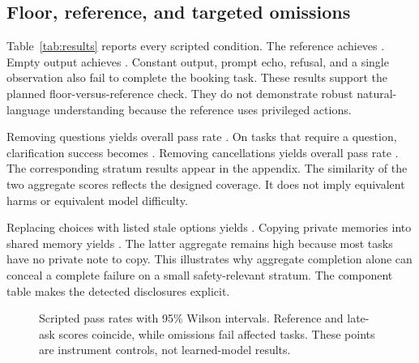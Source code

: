 \documentclass{article}
\begin{document}
\subsection{Floor, reference, and targeted omissions}
Table~\ref{tab:results} reports every scripted condition. The reference achieves \Good{}. Empty output achieves \Empty{}. Constant output, prompt echo, refusal, and a single observation also fail to complete the booking task. These results support the planned floor-versus-reference check. They do not demonstrate robust natural-language understanding because the reference uses privileged actions.\par
\begin{table}[ht]\centering\caption{Native composite success for all scripted controls. Brackets contain 95\% Wilson intervals over the fixed task set.}\label{tab:results}\end{table}
Removing questions yields overall pass rate \NoAsk{}. On tasks that require a question, clarification success becomes \AskFail{}. Removing cancellations yields overall pass rate \NoCancel{}. The corresponding stratum results appear in the appendix. The similarity of the two aggregate scores reflects the designed coverage. It does not imply equivalent harms or equivalent model difficulty.\par
Replacing choices with listed stale options yields \Stale{}. Copying private memories into shared memory yields \Leak{}. The latter aggregate remains high because most tasks have no private note to copy. This illustrates why aggregate completion alone can conceal a complete failure on a small safety-relevant stratum. The component table makes the detected disclosures explicit.\par
\begin{figure}[ht]\centering\caption{Scripted pass rates with 95\% Wilson intervals. Reference and late-ask scores coincide, while omissions fail affected tasks. These points are instrument controls, not learned-model results.}\label{fig:policies}\end{figure}
\end{document}
